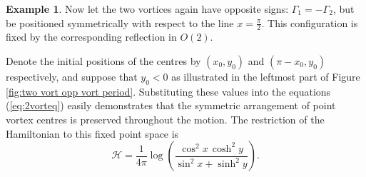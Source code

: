 \documentclass[11pt,twoside]{article}
\theoremstyle{definition}
\newtheorem{Exam}[theorem]{Example}
\numberwithin{equation}{section}
\begin{document}
  \begin{Exam}
\label{st: Example 2}
Now let the two vortices again have opposite signs: $\Gamma_1 = -\Gamma_2$, but be positioned symmetrically with respect to the line $x = \frac{\pi}{2}$.  This configuration is fixed by the corresponding reflection in $O(2)$. 

 Denote the initial positions of the centres by $(x_0, y_0)$ and $(\pi-x_0, y_0)$ respectively, and suppose that $y_0<0$ as illustrated in the leftmost part of  Figure \ref{fig:two vort opp vort period}. Substituting these values into the equations (\ref{eq:2vorteq}) easily demonstrates that the symmetric arrangement of point vortex centres is preserved throughout the motion. The restriction of the Hamiltonian to this fixed point space is 
\[
\mathcal{H} = \frac{1}{4\pi}\log\left(\frac{\cos^2x\,\cosh^2y}{\sin^2x + \sinh^2y}\right).
\]


\end{Exam}
\end{document}
